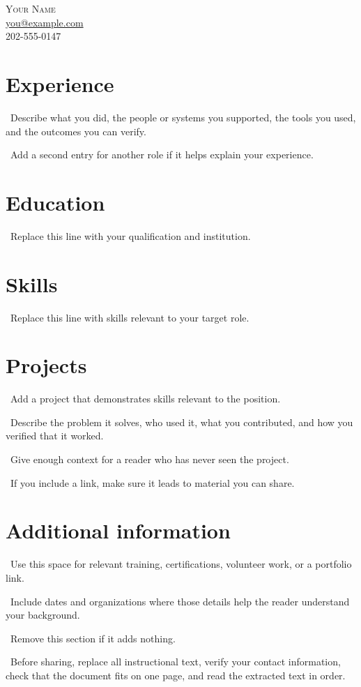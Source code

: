 \documentclass[10pt,letterpaper]{article}
\newcommand{\resumeItem}[1]{\noindent\textbullet\ #1\par}
\begin{document}
\begin{center}
{\Large\scshape Your Name}\\
\href{mailto:you@example.com}{you@example.com} \\ 202-555-0147
\end{center}
\section{Experience}
\resumeItem{Describe what you did, the people or systems you supported, the tools you used, and the outcomes you can verify.}
\resumeItem{Add a second entry for another role if it helps explain your experience.}
\section{Education}
\resumeItem{Replace this line with your qualification and institution.}
\section{Skills}
\resumeItem{Replace this line with skills relevant to your target role.}
\section{Projects}
\resumeItem{Add a project that demonstrates skills relevant to the position.}
\resumeItem{Describe the problem it solves, who used it, what you contributed, and how you verified that it worked.}
\resumeItem{Give enough context for a reader who has never seen the project.}
\resumeItem{If you include a link, make sure it leads to material you can share.}
\section{Additional information}
\resumeItem{Use this space for relevant training, certifications, volunteer work, or a portfolio link.}
\resumeItem{Include dates and organizations where those details help the reader understand your background.}
\resumeItem{Remove this section if it adds nothing.}
\resumeItem{Before sharing, replace all instructional text, verify your contact information, check that the document fits on one page, and read the extracted text in order.}
\end{document}
